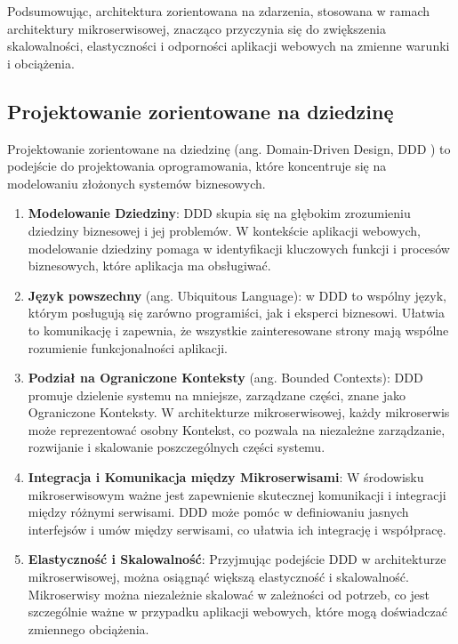 Podsumowując, architektura zorientowana na zdarzenia, stosowana w ramach architektury mikroserwisowej, znacząco przyczynia się do zwiększenia skalowalności, elastyczności i odporności aplikacji webowych na zmienne warunki i obciążenia.

\subsection{Projektowanie zorientowane na dziedzinę}

Projektowanie zorientowane na dziedzinę (ang. Domain-Driven Design, DDD \cite{ddd}) to podejście do projektowania oprogramowania, które koncentruje się na modelowaniu złożonych systemów biznesowych.

\begin{enumerate}
    \item \textbf{Modelowanie Dziedziny}: DDD skupia się na głębokim zrozumieniu dziedziny biznesowej i jej problemów. W kontekście aplikacji webowych, modelowanie dziedziny pomaga w identyfikacji kluczowych funkcji i procesów biznesowych, które aplikacja ma obsługiwać.

    \item \textbf{Język powszechny} (ang. Ubiquitous Language): w DDD to wspólny język, którym posługują się zarówno programiści, jak i eksperci biznesowi. Ułatwia to komunikację i zapewnia, że wszystkie zainteresowane strony mają wspólne rozumienie funkcjonalności aplikacji.

    \item \textbf{Podział na Ograniczone Konteksty }(ang. Bounded Contexts): DDD promuje dzielenie systemu na mniejsze, zarządzane części, znane jako Ograniczone Konteksty. W architekturze mikroserwisowej, każdy mikroserwis może reprezentować osobny Kontekst, co pozwala na niezależne zarządzanie, rozwijanie i skalowanie poszczególnych części systemu.

    \item \textbf{Integracja i Komunikacja między Mikroserwisami}: W środowisku mikroserwisowym ważne jest zapewnienie skutecznej komunikacji i integracji między różnymi serwisami. DDD może pomóc w definiowaniu jasnych interfejsów i umów między serwisami, co ułatwia ich integrację i współpracę.

    \item \textbf{Elastyczność i Skalowalność}: Przyjmując podejście DDD w architekturze mikroserwisowej, można osiągnąć większą elastyczność i skalowalność. Mikroserwisy można niezależnie skalować w zależności od potrzeb, co jest szczególnie ważne w przypadku aplikacji webowych, które mogą doświadczać zmiennego obciążenia.


\end{enumerate}
